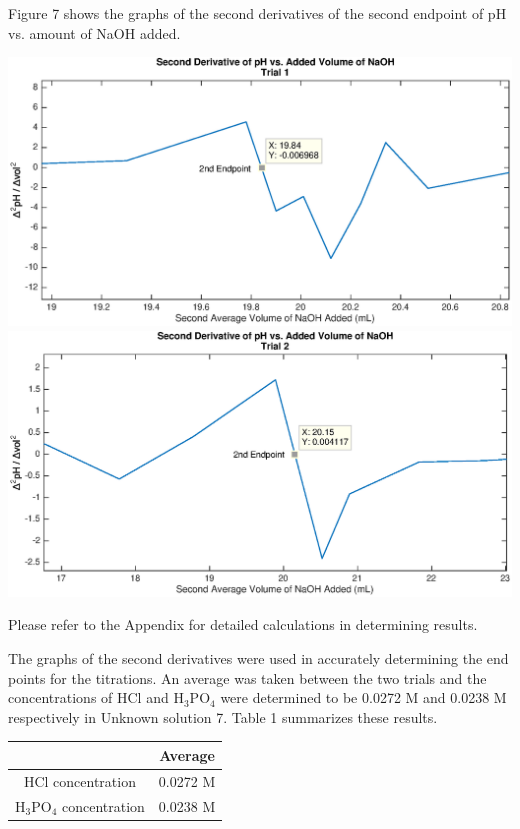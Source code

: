 \documentclass{article}
\begin{document}
Figure 7 shows the graphs of the second derivatives of the second endpoint of pH vs. amount of NaOH
added. 
\begin{center}
        \includegraphics[scale=0.7]{2dev_2_1}
        \includegraphics[scale=0.7]{2dev_2_2}
\end{center}

Please refer to the Appendix for detailed calculations in determining results.

The graphs of the second derivatives were used in accurately determining the
end points for the titrations. An average was taken between the two trials and
the concentrations of HCl and H$_3$PO$_4$ were determined to be 0.0272 M and
0.0238 M respectively in Unknown solution 7.
Table 1 summarizes these results.
\begin{center}
\begin{tabular}{|c|c|}
        \hline
        & Average \\
        \hline
        HCl concentration & 0.0272 M \\
        \hline
        H$_3$PO$_4$ concentration & 0.0238 M \\
        \hline
\end{tabular}
\end{center}
\end{document}
